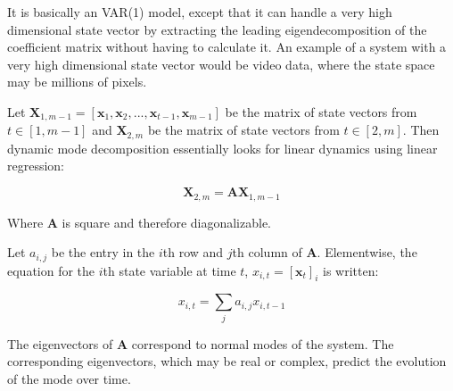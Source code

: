 It is basically an VAR(1) model, except that it can handle a very high dimensional state vector by extracting the leading eigendecomposition of the coefficient matrix without having to calculate it. An example of a system with a very high dimensional state vector would be video data, where the state space may be millions of pixels. 

Let $\mathbf{X}_{1,m-1} = \left[\mathbf{x}_1,\mathbf{x}_2,...,\mathbf{x}_{t-1},\mathbf{x}_{m-1}\right]$ be the matrix of state vectors from $t\in[1,m-1]$ and $\mathbf{X}_{2,m}$ be the matrix of state vectors from $t\in[2,m]$. Then dynamic mode decomposition essentially looks for linear dynamics using linear regression:

\begin{equation}
\mathbf{X}_{2,m} = \mathbf{A}\mathbf{X}_{1,m-1}
\end{equation}

Where $\mathbf{A}$ is square and therefore diagonalizable.

Let $a_{i,j}$ be the entry in the $i$th row and $j$th column of $\mathbf{A}$. Elementwise, the equation for the $i$th state variable at time $t$, $x_{i,t} = [\mathbf{x}_t]_i$ is written:

\begin{equation}
x_{i,t} = \sum_j a_{i,j} x_{i,t-1}
\end{equation}

The eigenvectors of $\mathbf{A}$  correspond to normal modes of the system. The corresponding eigenvectors, which may be real or complex, predict the evolution of the mode over time.
